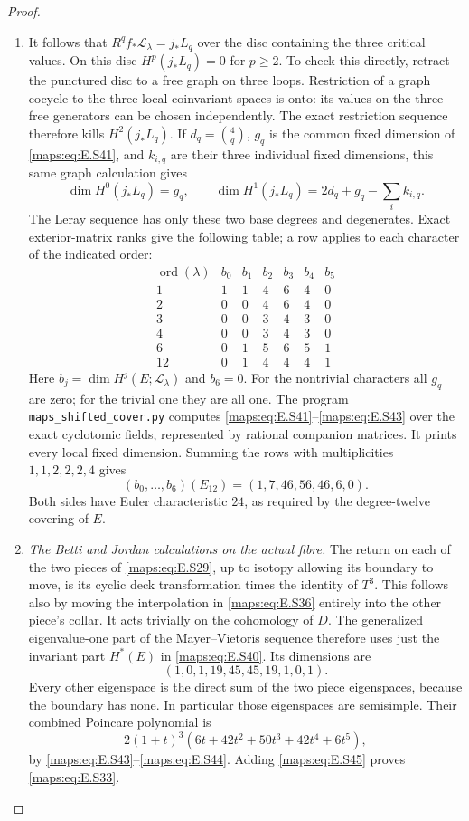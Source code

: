 \begin{proof}
\begin{enumerate}[label=\arabic*.,leftmargin=*]
\item It follows that $R^q f_*\mathcal L_\lambda=j_*L_q$ over
the disc containing the three critical values. On this
disc $H^p(j_*L_q)=0$ for $p\geq2$. To check this directly,
retract the punctured disc to a free graph on three loops.
Restriction of a graph cocycle to the three local
coinvariant spaces is onto: its values on the three free
generators can be chosen independently. The exact
restriction sequence therefore kills $H^2(j_*L_q)$.
If $d_q=\binom4q$, $g_q$ is the common fixed dimension of
\eqref{maps:eq:E.S41}, and $k_{i,q}$ are their three individual fixed
dimensions, this same graph calculation gives
\[
 \dim H^0(j_*L_q)=g_q,\qquad
 \dim H^1(j_*L_q)=2d_q+g_q-\sum_i k_{i,q}.
 \tag{E.S42}\label{maps:eq:E.S42}
\]
The Leray sequence has only these two base degrees and
degenerates. Exact exterior-matrix ranks give the following
table; a row applies to each character of the indicated
order:
\[
 \begin{array}{c|rrrrrr}
 \operatorname{ord}(\lambda)&b_0&b_1&b_2&b_3&b_4&b_5\\ \hline
 1 &1&1&4&6&4&0\\
 2 &0&0&4&6&4&0\\
 3 &0&0&3&4&3&0\\
 4 &0&0&3&4&3&0\\
 6 &0&1&5&6&5&1\\
 12&0&1&4&4&4&1
 \end{array}
 \tag{E.S43}\label{maps:eq:E.S43}
\]
Here $b_j=\dim H^j(E;\mathcal L_\lambda)$ and $b_6=0$.
For the nontrivial characters all $g_q$ are zero; for the
trivial one they are all one. The program
\texttt{maps\_shifted\_cover.py} computes \eqref{maps:eq:E.S41}--\eqref{maps:eq:E.S43}
over the exact cyclotomic fields, represented by rational
companion matrices. It prints every local fixed dimension.
Summing the rows with multiplicities $1,1,2,2,2,4$ gives
\[
             (b_0,\ldots,b_6)(E_{12})=(1,7,46,56,46,6,0).
 \tag{E.S44}\label{maps:eq:E.S44}
\]
Both sides have Euler characteristic $24$, as required by
the degree-twelve covering of $E$.

\item \emph{The Betti and Jordan calculations on the actual fibre.}
The return on each of the two pieces of \eqref{maps:eq:E.S29}, up to
isotopy allowing its boundary to move, is its cyclic deck
transformation times the identity of $T^3$. This follows
also by moving the interpolation in \eqref{maps:eq:E.S36} entirely into
the other piece's collar. It acts trivially on the
cohomology of $D$. The generalized eigenvalue-one part of
the Mayer--Vietoris sequence therefore uses just the
invariant part $H^*(E)$ in \eqref{maps:eq:E.S40}. Its dimensions are
\[
       (1,0,1,19,45,45,19,1,0,1).
 \tag{E.S45}\label{maps:eq:E.S45}
\]
Every other eigenspace is the direct sum of the two piece
eigenspaces, because the boundary has none. In particular
those eigenspaces are semisimple. Their combined Poincare
polynomial is
\[
     2(1+t)^3(6t+42t^2+50t^3+42t^4+6t^5),
 \tag{E.S46}\label{maps:eq:E.S46}
\]
by \eqref{maps:eq:E.S43}--\eqref{maps:eq:E.S44}. Adding \eqref{maps:eq:E.S45} proves \eqref{maps:eq:E.S33}.


\end{enumerate}
\end{proof}
